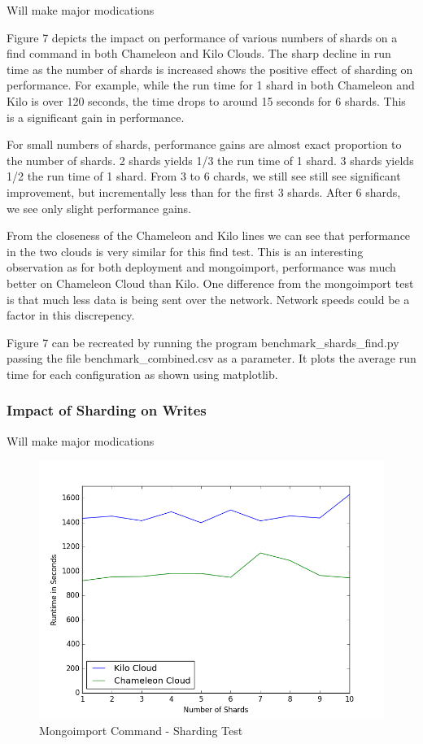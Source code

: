 \documentclass[9pt,twocolumn,twoside]{styles/osajnl}
\begin{document}
Will make major modications

Figure 7 depicts the impact on performance of various numbers of shards on a find command in both Chameleon and Kilo Clouds.  The sharp decline in run time as the number of shards is increased shows the positive effect of sharding on performance.  For example, while the run time for 1 shard in both Chameleon and Kilo is over 120 seconds, the time drops to around 15 seconds for 6 shards.  This is a significant gain in performance.  

For small numbers of shards, performance gains are almost exact proportion to the number of shards.  2 shards yields 1/3 the run time of 1 shard.  3 shards yields 1/2 the run time of 1 shard.  From 3 to 6 chards, we still see still see significant improvement, but incrementally less than for the first 3 shards.  After 6 shards, we see only slight performance gains.

From the closeness of the Chameleon and Kilo lines we can see that performance in the two clouds is very similar for this find test.  This is an interesting observation as for both deployment and mongoimport, performance was much better on Chameleon Cloud than Kilo.  One difference from the mongoimport test is that much less data is being sent over the network.  Network speeds could be a factor in this discrepency.

Figure 7 can be recreated by running the program benchmark\_shards\_find.py passing the file benchmark\_combined.csv as a parameter.  It plots the average run time for each configuration as shown using matplotlib.



\subsubsection{Impact of Sharding on Writes}

Will make major modications

\begin{figure}[!ht]
  \includegraphics[scale=0.45]{images/shard_import.png}
  \caption{Mongoimport Command - Sharding Test}
\end{figure}
\end{document}

